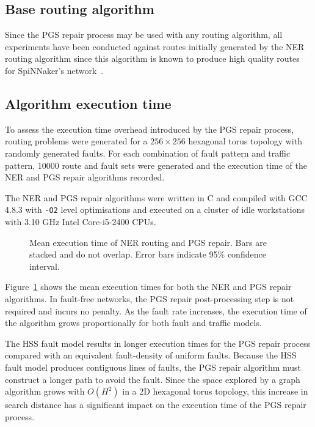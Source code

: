 		\subsection{Base routing algorithm}
			
			Since the PGS repair process may be used with any routing algorithm, all
			experiments have been conducted against routes initially generated by the
			NER routing algorithm since this algorithm is known to produce high
			quality routes for SpiNNaker's network~\cite{navaridas14}.
			
		\subsection{Algorithm execution time}
			
			To assess the execution time overhead introduced by the PGS repair
			process, routing problems were generated for a $256\times256$ hexagonal
			torus topology with randomly generated faults. For each combination of
			fault pattern and traffic pattern, \num{10000} route and fault sets were
			generated and the execution time of the NER and PGS repair algorithms
			recorded.
			
			The NER and PGS repair algorithms were written in C and compiled with GCC
			4.8.3 with \verb|-O2| level optimisations and executed on a cluster of
			idle workstations with 3.10 GHz Intel Core-i5-2400 CPUs.
			
			\begin{figure}
				\center
				
				\caption[Mean execution time of NER routing and PGS repair.]%
				{Mean execution time of NER routing and PGS repair. Bars are stacked
				and do not overlap. Error bars indicate 95\% confidence interval.}
				\label{fig:routing-runtimes}
			\end{figure}
			
			Figure~\ref{fig:routing-runtimes} shows the mean execution times for both
			the NER and PGS repair algorithms. In fault-free networks, the PGS repair
			post-processing step is not required and incurs no penalty. As the fault
			rate increases, the execution time of the algorithm grows proportionally
			for both fault and traffic models.
			
			The HSS fault model results in longer execution times for the PGS repair
			process compared with an equivalent fault-density of uniform faults.
			Because the HSS fault model produces contiguous lines of faults, the PGS
			repair algorithm must construct a longer path to avoid the fault.  Since
			the space explored by a graph algorithm grows with $O(H^2)$ in a 2D
			hexagonal torus topology, this increase in search distance has a
			significant impact on the execution time of the PGS repair process.
			
